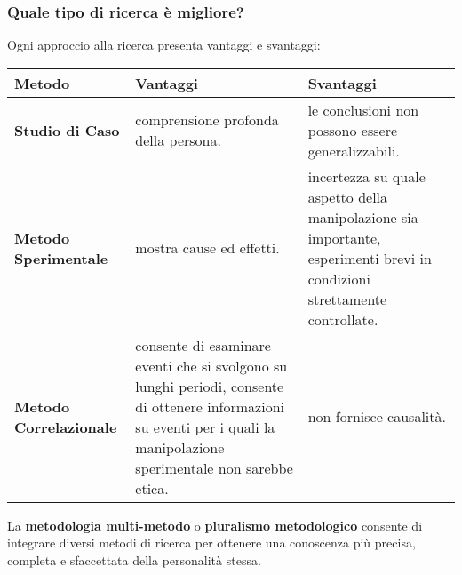 \documentclass{subfiles}
\begin{document}
        \subsubsection*{Quale tipo di ricerca è migliore?}
        Ogni approccio alla ricerca presenta vantaggi e svantaggi:

        \begin{center}
            \begin{tabular}{|m{5cm}| m{4cm} |m{4cm}|}
            \hline
            \textbf{Metodo} & \textbf{Vantaggi} & \textbf{Svantaggi}\\
            \hline
            \textbf{Studio di Caso} & comprensione profonda della persona. & le conclusioni non possono essere generalizzabili. \\
            \hline
            \textbf{Metodo Sperimentale} & mostra cause ed effetti. & incertezza su quale aspetto della manipolazione sia importante, esperimenti brevi in condizioni strettamente controllate.\\
            \hline
            \textbf{Metodo Correlazionale} & consente di esaminare eventi che si svolgono su lunghi periodi, consente di ottenere informazioni su eventi per i quali la manipolazione sperimentale non sarebbe etica. & non fornisce causalità.\\
            \hline
        \end{tabular}
        \end{center}
        

        \vspace{10pt}
        La \textbf{metodologia multi-metodo} o \textbf{pluralismo metodologico} consente di 
        integrare diversi metodi di ricerca per ottenere una conoscenza più precisa, completa e 
        sfaccettata della personalità stessa.

    \clearpage
\end{document}
